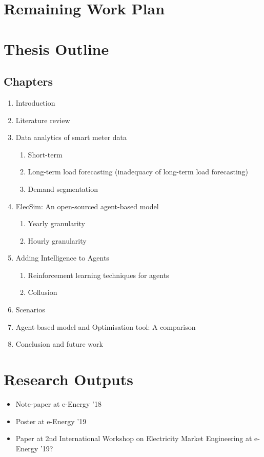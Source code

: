 \documentclass[12pt]{article}
\begin{document}
\clearpage

\section{Remaining Work Plan}








\clearpage

\section{Thesis Outline}

\subsection{Chapters}
\begin{enumerate}

  \item Introduction
  \item Literature review
  \item Data analytics of smart meter data
  \begin{enumerate}
	  \item Short-term 
	  \item Long-term load forecasting (inadequacy of long-term load forecasting)
	  \item Demand segmentation
  \end{enumerate}
  \item ElecSim: An open-sourced agent-based model
    \begin{enumerate}
	  \item Yearly granularity
	  \item Hourly granularity
  \end{enumerate}
  \item Adding Intelligence to Agents
  \begin{enumerate}
	  \item Reinforcement learning techniques for agents
	  \item Collusion
  \end{enumerate}
  \item Scenarios
  \item Agent-based model and Optimisation tool: A comparison
  \item Conclusion and future work
  
\end{enumerate}







\clearpage

\section{Research Outputs}


\begin{itemize}
	\item Note-paper at e-Energy '18
	\item Poster at e-Energy '19
	\item Paper at 2nd International Workshop on Electricity Market Engineering at e-Energy '19?
\end{itemize}




\clearpage
\end{document}

